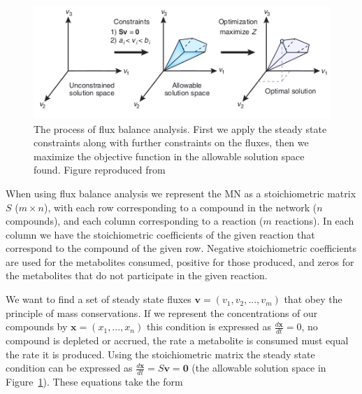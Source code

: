 \documentclass[a4paper,12pt]{article}
\begin{document}
	\begin{figure}[htpb]
		\centering
		\includegraphics[width=0.8\linewidth]{fba_frompaper.png}
		\caption{The process of flux balance analysis. First we apply the steady state constraints along with further constraints on the fluxes, then we maximize the objective function in the allowable solution space found. Figure reproduced from \cite[]{whatisfluxbalance} }
		\label{fig:fluxbalance}
	\end{figure}

	When using flux balance analysis we represent the MN as a stoichiometric matrix $S$ ($m\times n$), with each row corresponding to a compound in the network ($n$ compounds), and each column corresponding to a reaction ($m$ reactions). In each column we have the stoichiometric coefficients of the given reaction that correspond to the compound of the given row. Negative stoichiometric coefficients are used for the metabolites consumed, positive for those produced, and zeros for the metabolites that do not participate in the given reaction.
	
	We want to find a set of steady state fluxes  $\mathbf{v}=\left( v_1,v_2,...,v_m \right)$ that obey the principle of mass conservations. If we represent the concentrations of our compounds by  ${\mathbf{x}=\left( x_1, ... , x_n \right)}$ this condition is expressed as $\frac{d\mathbf{x}}{dt}=0$, no compound is depleted or accrued, the rate a metabolite is consumed must equal the rate it is produced. Using the stoichiometric matrix the steady state condition can be expressed as $\frac{d\mathbf{x}}{dt}= S\mathbf{v}=\mathbf{0}$ (the allowable solution space in Figure~\ref{fig:fluxbalance}). These equations take the form
	
\end{document}
